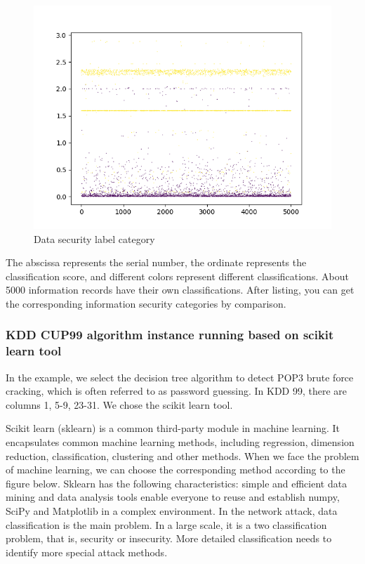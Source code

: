 \documentclass[UTF8]{article}
\begin{document}
\begin{figure}[h]
\centering
\includegraphics[scale = 0.5]{1}
\caption{Data security label category}
\end{figure}

The abscissa represents the serial number, the ordinate represents the classification score, and different colors represent different classifications. About 5000 information records have their own classifications. After listing, you can get the corresponding information security categories by comparison.

\subsubsection{KDD CUP99 algorithm instance running based on scikit learn tool}

In the example, we select the decision tree algorithm to detect POP3 brute force cracking, which is often referred to as password guessing. In KDD 99, there are columns 1, 5-9, 23-31. We chose the scikit learn tool.

Scikit learn (sklearn) is a common third-party module in machine learning. It encapsulates common machine learning methods, including regression, dimension reduction, classification, clustering and other methods. When we face the problem of machine learning, we can choose the corresponding method according to the figure below. Sklearn has the following characteristics: simple and efficient data mining and data analysis tools enable everyone to reuse and establish numpy, SciPy and Matplotlib in a complex environment. In the network attack, data classification is the main problem. In a large scale, it is a two classification problem, that is, security or insecurity. More detailed classification needs to identify more special attack methods.
\end{document}
